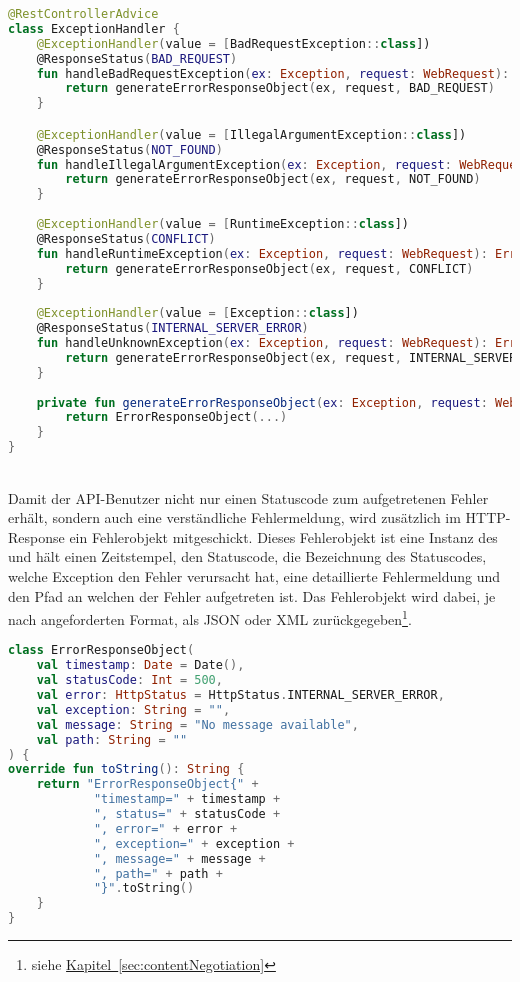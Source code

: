 \begin{lstlisting}[style=lstStyleFramed, language=Kotlin, caption={Spring-Konfiguration des Exceptionhandling}, label=lst:springExceptionHandling, float]
@RestControllerAdvice
class ExceptionHandler {
	@ExceptionHandler(value = [BadRequestException::class])
	@ResponseStatus(BAD_REQUEST)
	fun handleBadRequestException(ex: Exception, request: WebRequest): ErrorResponseObject {
		return generateErrorResponseObject(ex, request, BAD_REQUEST)
	}

	@ExceptionHandler(value = [IllegalArgumentException::class])
	@ResponseStatus(NOT_FOUND)
	fun handleIllegalArgumentException(ex: Exception, request: WebRequest): ErrorResponseObject {
		return generateErrorResponseObject(ex, request, NOT_FOUND)
	}
	
	@ExceptionHandler(value = [RuntimeException::class])
	@ResponseStatus(CONFLICT)
	fun handleRuntimeException(ex: Exception, request: WebRequest): ErrorResponseObject {
		return generateErrorResponseObject(ex, request, CONFLICT)
	}
	
	@ExceptionHandler(value = [Exception::class])
	@ResponseStatus(INTERNAL_SERVER_ERROR)
	fun handleUnknownException(ex: Exception, request: WebRequest): ErrorResponseObject {
		return generateErrorResponseObject(ex, request, INTERNAL_SERVER_ERROR)
	}
	
	private fun generateErrorResponseObject(ex: Exception, request: WebRequest, statusCode: HttpStatus): ErrorResponseObject {
		return ErrorResponseObject(...)
	}
}
\end{lstlisting}
\\
Damit der \gls{API}-Benutzer nicht nur einen Statuscode zum aufgetretenen Fehler erhält, sondern auch eine verständliche Fehlermeldung, wird zusätzlich im \gls{HTTP}-Response ein Fehlerobjekt mitgeschickt. Dieses Fehlerobjekt ist eine Instanz des  und hält einen Zeitstempel, den Statuscode, die Bezeichnung des Statuscodes, welche Exception den Fehler verursacht hat, eine detaillierte Fehlermeldung und den Pfad an welchen der Fehler aufgetreten ist. Das Fehlerobjekt wird dabei, je nach angeforderten Format, als \gls{JSON} oder \gls{XML} zurückgegeben\footnote{siehe \hyperref[sec:contentNegotiation]{Kapitel~\ref{sec:contentNegotiation}}}.
\\
\begin{lstlisting}[style=lstStyleFramed, language=Kotlin, caption={Das Fehlerobjekt \code{ErrorResponseObject}}, label=lst:errorResponseObject, float]
class ErrorResponseObject(
	val timestamp: Date = Date(),
	val statusCode: Int = 500,
	val error: HttpStatus = HttpStatus.INTERNAL_SERVER_ERROR,
	val exception: String = "",
	val message: String = "No message available",
	val path: String = ""
) {
override fun toString(): String {
	return "ErrorResponseObject{" +
			"timestamp=" + timestamp +
			", status=" + statusCode +
			", error=" + error +
			", exception=" + exception +
			", message=" + message +
			", path=" + path +
			"}".toString()
	}
}
\end{lstlisting}

